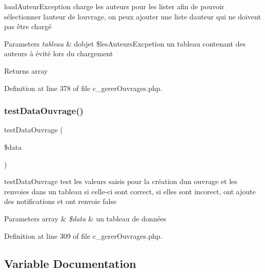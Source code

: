 load\+Auteur\+Exception charge les auteurs pour les lister afin de pouvoir sélectionner l\textquotesingle{}auteur de l\textquotesingle{}ouvrage, on peux ajouter une liste d\textquotesingle{}auteur qui ne doivent pas être chargé 
\begin{DoxyParams}{Parameters}
{\em tableau} & d\textquotesingle{}objet \$les\+Auteurs\+Excpetion un tableau contenant des auteurs à évité lors du chargement \\
\hline
\end{DoxyParams}
\begin{DoxyReturn}{Returns}
array 
\end{DoxyReturn}


Definition at line 378 of file c\+\_\+gerer\+Ouvrages.\+php.

\mbox{\label{c__gerer_ouvrages_8php_aa8120b3d81eb0fad49b40c7dfb7ddb2b}} 
\subsubsection{\texorpdfstring{test\+Data\+Ouvrage()}{testDataOuvrage()}}
{\footnotesize\ttfamily test\+Data\+Ouvrage (\begin{DoxyParamCaption}\item[{}]{\$data }\end{DoxyParamCaption})}

test\+Data\+Ouvrage test les valeurs saisis pour la création d\textquotesingle{}un ouvrage et les renvoies dans un tableau si celle-\/ci sont correct, si elles sont incorect, ont ajoute des notifications et ont renvoie false 
\begin{DoxyParams}[1]{Parameters}
array & {\em \$data} & un tableau de données \\
\hline
\end{DoxyParams}


Definition at line 309 of file c\+\_\+gerer\+Ouvrages.\+php.



\subsection{Variable Documentation}
\mbox{\label{c__gerer_ouvrages_8php_aa4db7f7a27517cf5cd3ff1f2577caa64}} 

